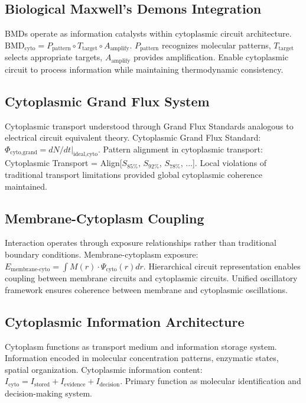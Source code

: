 \documentclass[12pt,a4paper]{article}
\begin{document}
\subsection{Biological Maxwell's Demons Integration}

BMDs operate as information catalysts within cytoplasmic circuit architecture. $\text{BMD}_{\text{cyto}} = P_{\text{pattern}} \circ T_{\text{target}} \circ A_{\text{amplify}}$. $P_{\text{pattern}}$ recognizes molecular patterns, $T_{\text{target}}$ selects appropriate targets, $A_{\text{amplify}}$ provides amplification. Enable cytoplasmic circuit to process information while maintaining thermodynamic consistency.

\subsection{Cytoplasmic Grand Flux System}

Cytoplasmic transport understood through Grand Flux Standards analogous to electrical circuit equivalent theory. Cytoplasmic Grand Flux Standard: $\Phi_{\text{cyto,grand}} = dN/dt|_{\text{ideal,cyto}}$. Pattern alignment in cytoplasmic transport: Cytoplasmic Transport = Align[$S_{85\%}$, $S_{92\%}$, $S_{78\%}$, ...]. Local violations of traditional transport limitations provided global cytoplasmic coherence maintained.

\subsection{Membrane-Cytoplasm Coupling}

Interaction operates through exposure relationships rather than traditional boundary conditions. Membrane-cytoplasm exposure: $E_{\text{membrane-cyto}} = \int M(r) \cdot \Psi_{\text{cyto}}(r) dr$. Hierarchical circuit representation enables coupling between membrane circuits and cytoplasmic circuits. Unified oscillatory framework ensures coherence between membrane and cytoplasmic oscillations.

\subsection{Cytoplasmic Information Architecture}

Cytoplasm functions as transport medium and information storage system. Information encoded in molecular concentration patterns, enzymatic states, spatial organization. Cytoplasmic information content: $I_{\text{cyto}} = I_{\text{stored}} + I_{\text{evidence}} + I_{\text{decision}}$. Primary function as molecular identification and decision-making system.
\end{document}
